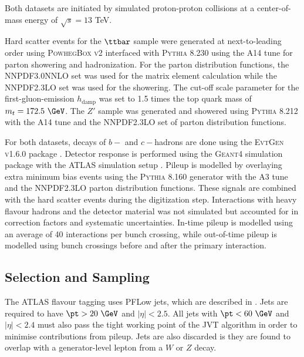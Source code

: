 Both datasets are initiated by simulated proton-proton collisions at a center-of-mass energy of $\sqrt{s} = 13$ TeV.

Hard scatter events for the $\ttbar$ sample were generated at next-to-leading order using \textsc{PowhegBox v2} \cite{Powheg1, Powheg2, Powheg3} interfaced with \textsc{Pythia 8.230} \cite{Pythia8} using the \textsc{A14} tune \cite{A14} for parton showering and hadronization.
For the parton distribution functions, the \textsc{NNPDF3.0NNLO} \cite{PDF3.0} set was used for the matrix element calculation while the \textsc{NNPDF2.3LO} \cite{PDF2.3} set was used for the showering.
The cut-off scale parameter for the first-gluon-emission $h_{\text{damp}}$ was set to 1.5 times the top quark mass of $m_t = 172.5~\GeV$.
The $Z'$ sample was generated and showered using \textsc{Pythia 8.212} with the \textsc{A14} tune and the \textsc{NNPDF2.3LO} set of parton distribution functions.

For both datasets, decays of $b-$ and $c-$hadrons are done using the \textsc{EvtGen v1.6.0} package \cite{EvtGen}.
Detector response is performed using the \textsc{Geant4} simulation package \cite{Geant4} with the \textsc{ATLAS} simulation setup \cite{ATLASSim}.
Pileup is modelled by overlaying extra minimum bias events using the \textsc{Pythia 8.160} generator with the \textsc{A3} tune \cite{A3} and the \textsc{NNPDF2.3LO} parton distribution functions.
These signals are combined with the hard scatter events during the digitization step.
Interactions with heavy flavour hadrons and the detector material was not simulated but accounted for in correction factors and systematic uncertainties.
In-time pileup is modelled using an average of 40 interactions per bunch crossing, while out-of-time pileup is modelled using bunch crossings before and after the primary interaction.

\subsection{Selection and Sampling}

The ATLAS flavour tagging uses PFLow jets, which are described in .
Jets are required to have $\pt > 20~\GeV$ and $|\eta| < 2.5$.
All jets with $\pt < 60~\GeV$ and $|\eta| < 2.4$ must also pass the tight working point of the JVT algorithm in order to minimise contributions from pileup.
Jets are also discarded is they are found to overlap with a generator-level lepton from a $W$ or $Z$ decay.

